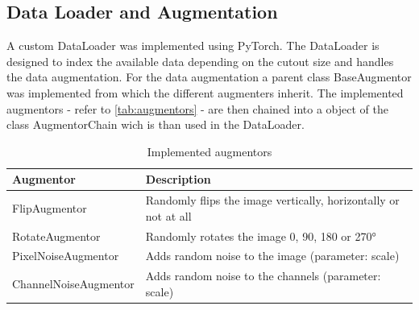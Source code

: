 \subsection{Data Loader and Augmentation}%

A custom DataLoader was implemented using PyTorch. The DataLoader is designed to index the available data
depending on the cutout size and handles the data augmentation. For the data augmentation a parent class
BaseAugmentor was implemented from which the different augmenters inherit. The implemented augmentors -
refer to \autoref{tab:augmentors} - are then chained into a object of the class AugmentorChain
wich is than used in the DataLoader.

\begin{table}
    \centering
    \begin{tabular}{|l|l|}
        \hline
        \textbf{Augmentor} & \textbf{Description} \\
        \hline
        FlipAugmentor & Randomly flips the image vertically, horizontally or not at all \\
        RotateAugmentor & Randomly rotates the image 0, 90, 180 or 270° \\
        PixelNoiseAugmentor & Adds random noise to the image (parameter: scale) \\
        ChannelNoiseAugmentor & Adds random noise to the channels (parameter: scale) \\
        \hline
    \end{tabular}
    \caption{Implemented augmentors}
    \label{tab:augmentors}
\end{table}
